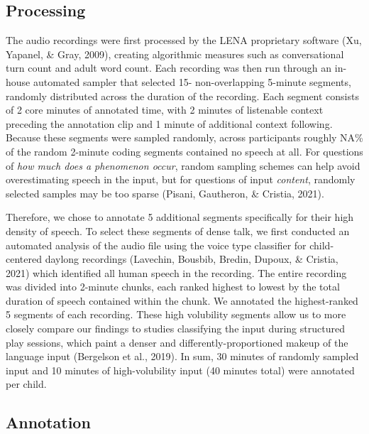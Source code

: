 \documentclass[
  man]{apa6}
\begin{document}
\hypertarget{processing}{%
\subsection{Processing}\label{processing}}

The audio recordings were first processed by the LENA proprietary software (Xu, Yapanel, \& Gray, 2009), creating algorithmic measures such as conversational turn count and adult word count. Each recording was then run through an in-house automated sampler that selected 15- non-overlapping 5-minute segments, randomly distributed across the duration of the recording. Each segment consists of 2 core minutes of annotated time, with 2 minutes of listenable context preceding the annotation clip and 1 minute of additional context following. Because these segments were sampled randomly, across participants roughly NA\% of the random 2-minute coding segments contained no speech at all. For questions of \emph{how much does a phenomenon occur}, random sampling schemes can help avoid overestimating speech in the input, but for questions of input \emph{content}, randomly selected samples may be too sparse (Pisani, Gautheron, \& Cristia, 2021).

Therefore, we chose to annotate 5 additional segments specifically for their high density of speech. To select these segments of dense talk, we first conducted an automated analysis of the audio file using the voice type classifier for child-centered daylong recordings (Lavechin, Bousbib, Bredin, Dupoux, \& Cristia, 2021) which identified all human speech in the recording. The entire recording was divided into 2-minute chunks, each ranked highest to lowest by the total duration of speech contained within the chunk. We annotated the highest-ranked 5 segments of each recording. These high volubility segments allow us to more closely compare our findings to studies classifying the input during structured play sessions, which paint a denser and differently-proportioned makeup of the language input (Bergelson et al., 2019). In sum, 30 minutes of randomly sampled input and 10 minutes of high-volubility input (40 minutes total) were annotated per child.

\hypertarget{annotation}{%
\subsection{Annotation}\label{annotation}}
\end{document}
